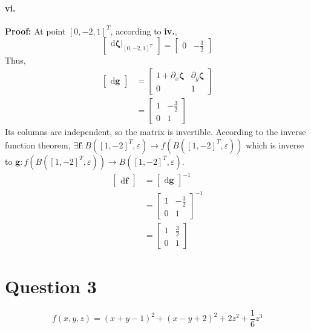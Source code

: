 \documentclass[11pt, a4paper]{article}
\begin{document}
\paragraph{vi.}
\textbf{Proof:}
At point $[0, -2, 1]^T$, according to \textbf{iv.},
$$\begin{bmatrix}
    \mathrm{d}\bm{\zeta}|_{[0, -2, 1]^T}
\end{bmatrix} = 
\begin{bmatrix}
    0 & -\frac{3}{2}
\end{bmatrix}$$
Thus,
$$\begin{aligned}
    \begin{bmatrix}
        \mathrm{d}\bm{g}
    \end{bmatrix} &=
    \begin{bmatrix}
        1 + \partial_x\bm{\zeta} & \partial_y\bm{\zeta} \\
        0 & 1
    \end{bmatrix} \\
    &=
    \begin{bmatrix}
        1 & -\frac{3}{2} \\
        0 & 1
    \end{bmatrix}
\end{aligned}$$
Its columns are independent, so the matrix is invertible. According to the inverse function theorem, $\exists \bm{f}: B([1, -2]^T, \varepsilon) \to f(B([1, -2]^T, \varepsilon))$ which is inverse to $\bm{g}: f(B([1, -2]^T, \varepsilon)) \to B([1, -2]^T, \varepsilon)$.
$$\begin{aligned}
    \begin{bmatrix}
        \mathrm{d}\bm{f}
    \end{bmatrix} &=
    \begin{bmatrix}
        \mathrm{d}\bm{g}
    \end{bmatrix}^{-1} \\
    &=
    \begin{bmatrix}
        1 & -\frac{3}{2} \\
        0 & 1
    \end{bmatrix}^{-1} \\
    &=
    \begin{bmatrix}
        1 & \frac{3}{2} \\
        0 & 1
    \end{bmatrix}
\end{aligned}$$

\section{Question 3}
$$f(x, y, z) = (x + y - 1)^2 + (x - y + 2)^2 + 2z^2 + \frac{1}{6}
z^3$$
\end{document}
